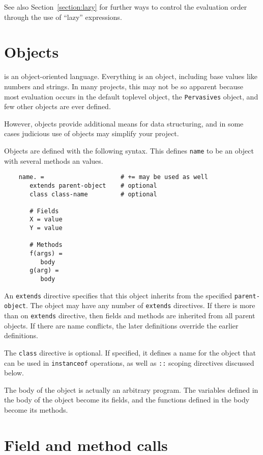 See also Section~\ref{section:lazy} for further ways to control the evaluation order through the use
of ``lazy'' expressions.

\section{Objects}

 is an object-oriented language.  Everything is an object, including
base values like numbers and strings.  In many projects, this may not be so apparent
because most evaluation occurs in the default toplevel object, the \verb+Pervasives+
object, and few other objects are ever defined.

However, objects provide additional means for data structuring, and in some cases
judicious use of objects may simplify your project.

Objects are defined with the following syntax.  This defines \verb+name+
to be an object with several methods an values.

\begin{verbatim}
    name. =                     # += may be used as well
       extends parent-object    # optional
       class class-name         # optional

       # Fields
       X = value
       Y = value

       # Methods
       f(args) =
          body
       g(arg) =
          body
\end{verbatim}

An \verb+extends+ directive specifies that this object inherits from
the specified \verb+parent-object+.  The object may have any number of
\verb+extends+ directives.  If there is more than on \verb+extends+
directive, then fields and methods are inherited from all parent
objects.  If there are name conflicts, the later definitions override
the earlier definitions.

The \verb+class+ directive is optional.  If specified, it defines a name
for the object that can be used in \verb+instanceof+ operations, as well
as \verb+::+ scoping directives discussed below.

The body of the object is actually an arbitrary program.  The
variables defined in the body of the object become its fields, and the
functions defined in the body become its methods.

\section{Field and method calls}

